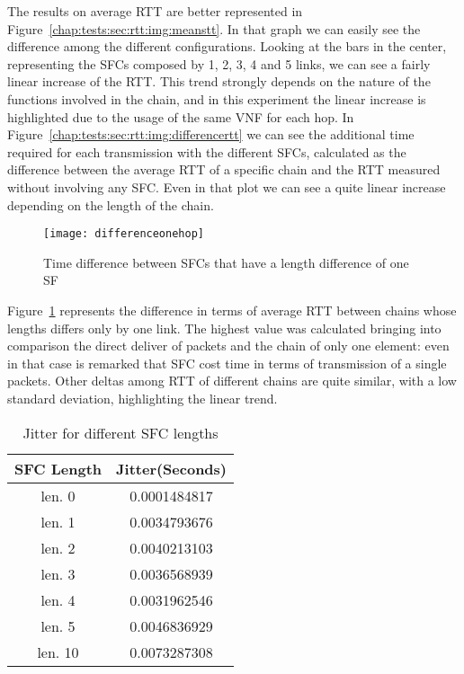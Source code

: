 \noindent
The results on average RTT are better represented in
Figure~\ref{chap:tests:sec:rtt:img:meanstt}. In that graph we can easily see
the difference among the different configurations. Looking at the bars in the
center, representing the SFCs composed by 1, 2, 3, 4 and 5 links, we can see a
fairly linear increase of the RTT. This trend strongly depends on the nature of
the functions involved in the chain, and in this experiment the linear increase
is highlighted due to the usage of the same VNF for each hop. In
Figure~\ref{chap:tests:sec:rtt:img:differencertt} we can see the additional
time required for each transmission with the different SFCs, calculated as the
difference between the average RTT of a specific chain and the RTT measured
without involving any SFC. Even in that plot we can see a quite linear
increase depending on the length of the chain.

\begin{figure}[H]
  \centering
  \texttt{[image: differenceonehop]}
  \caption{Time difference between SFCs that have a length difference of one SF}
  \label{chap:tests:sec:rtt:img:differenceonehop}
\end{figure}

\noindent
Figure~\ref{chap:tests:sec:rtt:img:differenceonehop} represents the
difference in terms of average RTT between chains whose lengths differs only by
one link. The highest value was calculated bringing into comparison the direct
deliver of packets and the chain of only one element: even in that case is
remarked that SFC cost time in terms of transmission of a single packets.
Other deltas among RTT of different chains are quite similar, with a low
standard deviation, highlighting the linear trend.

\begin{table}[H]
\centering
\begin{tabular}{@{}cc@{}}
\toprule
\textbf{SFC Length} & \textbf{Jitter(Seconds)} \\ \midrule
len. 0    & 0.0001484817    \\
len. 1    & 0.0034793676    \\
len. 2    & 0.0040213103    \\
len. 3    & 0.0036568939    \\
len. 4    & 0.0031962546    \\
len. 5    & 0.0046836929    \\
len. 10   & 0.0073287308    \\ \bottomrule
\end{tabular}
\caption{Jitter for different SFC lengths}
\label{chap:tests:sec:rtt:tab:jitter}
\end{table}

